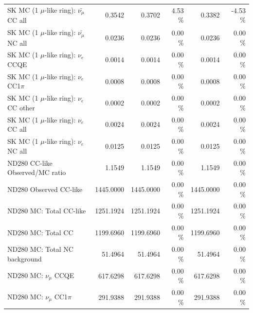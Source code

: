\begin{table}
\begin{tabular}{| l | r | r  r | r  r |}
                   SK MC (1 $\mu$-like ring): $\bar{\nu_{\mu}}$ CC all &          0.3542 &          0.3702 &  4.53 \%  &          0.3382 & -4.53 \%  \\ 
                   SK MC (1 $\mu$-like ring): $\bar{\nu_{\mu}}$ NC all &          0.0236 &          0.0236 &  0.00 \%  &          0.0236 &  0.00 \%  \\ 
                             SK MC (1 $\mu$-like ring): $\nu_{e}$ CCQE &          0.0014 &          0.0014 &  0.00 \%  &          0.0014 &  0.00 \%  \\ 
                         SK MC (1 $\mu$-like ring): $\nu_{e}$ CC1$\pi$ &          0.0008 &          0.0008 &  0.00 \%  &          0.0008 &  0.00 \%  \\ 
                         SK MC (1 $\mu$-like ring): $\nu_{e}$ CC other &          0.0002 &          0.0002 &  0.00 \%  &          0.0002 &  0.00 \%  \\ 
                           SK MC (1 $\mu$-like ring): $\nu_{e}$ CC all &          0.0024 &          0.0024 &  0.00 \%  &          0.0024 &  0.00 \%  \\ 
                           SK MC (1 $\mu$-like ring): $\nu_{e}$ NC all &          0.0125 &          0.0125 &  0.00 \%  &          0.0125 &  0.00 \%  \\ 
\hline
                                       ND280 CC-like Observed/MC ratio &          1.1549 &          1.1549 &  0.00 \%  &          1.1549 &  0.00 \%  \\ 
                                                ND280 Observed CC-like &       1445.0000 &       1445.0000 &  0.00 \%  &       1445.0000 &  0.00 \%  \\ 
                                               ND280 MC: Total CC-like &       1251.1924 &       1251.1924 &  0.00 \%  &       1251.1924 &  0.00 \%  \\ 
                                                    ND280 MC: Total CC &       1199.6960 &       1199.6960 &  0.00 \%  &       1199.6960 &  0.00 \%  \\ 
                                         ND280 MC: Total NC background &         51.4964 &         51.4964 &  0.00 \%  &         51.4964 &  0.00 \%  \\ 
\hline
                                            ND280 MC: $\nu_{\mu}$ CCQE &        617.6298 &        617.6298 &  0.00 \%  &        617.6298 &  0.00 \%  \\ 
                                        ND280 MC: $\nu_{\mu}$ CC1$\pi$ &        291.9388 &        291.9388 &  0.00 \%  &        291.9388 &  0.00 \%  \\ 

\end{tabular}
\end{table}
